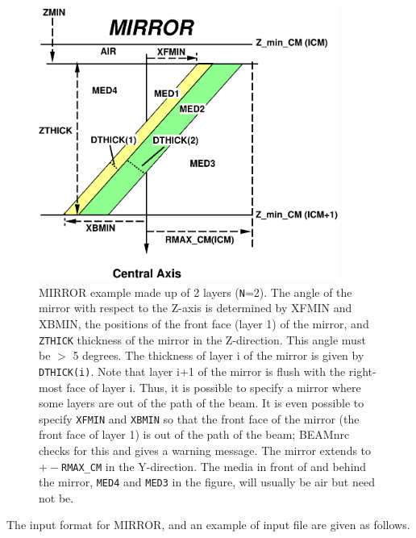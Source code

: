 \documentclass[12pt,twoside]{article}
\begin{document}
\begin{figure}[htbp]
\begin{center}
\leavevmode
\mbox{}\hspace{0cm}
\includegraphics[height=9cm]{figures/mirrord}
\caption[MIRROR CM geometry.]
{MIRROR example made up of 2 layers ({\tt N}=2).  The angle of the mirror with respect
to the Z-axis is determined by XFMIN and XBMIN, the positions of the
front face (layer 1) of the mirror, and {\tt ZTHICK} thickness of the
mirror in the Z-direction.  This angle must be $>$ 5 degrees.  The thickness of
layer i of the mirror is
given by {\tt DTHICK(i)}.  Note that layer i+1 of the mirror is flush with the
right-most face of layer i.  Thus, it is possible to specify a mirror
where some layers are out of the path of the beam.  It is even possible
to specify {\tt XFMIN} and {\tt XBMIN} so that the front face of the mirror (the
front face of layer 1) is out of the path of the beam; BEAMnrc checks for
this and gives a warning message.  The mirror extends to $+-${\tt RMAX\_CM} in
the Y-direction.  The media in front of and behind the mirror, {\tt MED4} and
{\tt MED3} in the figure, will usually be air but need not be.}
\label{fig_MIRRORD}
\end{center}
\end{figure}
\clearpage


The input format for MIRROR, and an example of input file are given as
follows.

\begin{small}

\end{small}

\end{document}

